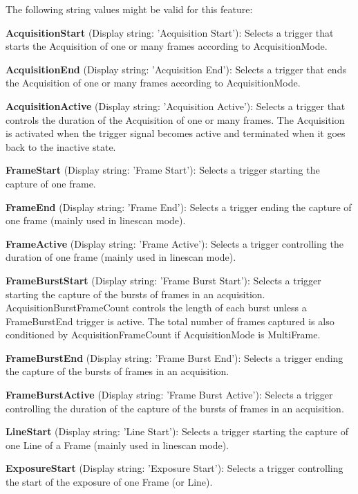 The following string values might be valid for this feature\+:
\begin{DoxyItemize}
\item {\bfseries Acquisition\+Start} (Display string\+: 'Acquisition Start')\+: Selects a trigger that starts the Acquisition of one or many frames according to Acquisition\+Mode.
\item {\bfseries Acquisition\+End} (Display string\+: 'Acquisition End')\+: Selects a trigger that ends the Acquisition of one or many frames according to Acquisition\+Mode.
\item {\bfseries Acquisition\+Active} (Display string\+: 'Acquisition Active')\+: Selects a trigger that controls the duration of the Acquisition of one or many frames. The Acquisition is activated when the trigger signal becomes active and terminated when it goes back to the inactive state.
\item {\bfseries Frame\+Start} (Display string\+: 'Frame Start')\+: Selects a trigger starting the capture of one frame.
\item {\bfseries Frame\+End} (Display string\+: 'Frame End')\+: Selects a trigger ending the capture of one frame (mainly used in linescan mode).
\item {\bfseries Frame\+Active} (Display string\+: 'Frame Active')\+: Selects a trigger controlling the duration of one frame (mainly used in linescan mode).
\item {\bfseries Frame\+Burst\+Start} (Display string\+: 'Frame Burst Start')\+: Selects a trigger starting the capture of the bursts of frames in an acquisition. Acquisition\+Burst\+Frame\+Count controls the length of each burst unless a Frame\+Burst\+End trigger is active. The total number of frames captured is also conditioned by Acquisition\+Frame\+Count if Acquisition\+Mode is Multi\+Frame.
\item {\bfseries Frame\+Burst\+End} (Display string\+: 'Frame Burst End')\+: Selects a trigger ending the capture of the bursts of frames in an acquisition.
\item {\bfseries Frame\+Burst\+Active} (Display string\+: 'Frame Burst Active')\+: Selects a trigger controlling the duration of the capture of the bursts of frames in an acquisition.
\item {\bfseries Line\+Start} (Display string\+: 'Line Start')\+: Selects a trigger starting the capture of one Line of a Frame (mainly used in linescan mode).
\item {\bfseries Exposure\+Start} (Display string\+: 'Exposure Start')\+: Selects a trigger controlling the start of the exposure of one Frame (or Line).

\end{DoxyItemize}
